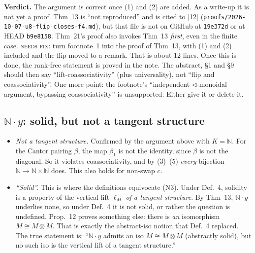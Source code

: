\documentclass[11pt]{article}
\newcommand{\tri}{\mathbin{\triangleleft}}
\newcommand{\N}{\mathbb{N}}
\newcommand{\iss}[1]{\textsc{#1}}
\begin{document}
\textbf{Verdict.} The argument is correct once (1) and (2) are added. As a write-up it is not yet a
proof. Thm~13 is ``not reproduced'' and is cited to [12] (\texttt{proofs/2026-10-07-u8-flip-closes-f4.md}),
but that file is not on GitHub at \texttt{19e372d} or at HEAD \texttt{b9e8158}. Thm~21's proof also
invokes Thm~13 \emph{first}, even in the finite case. \iss{needs fix}: turn footnote~1 into the proof
of Thm~13, with (1) and (2) included and the flip moved to a remark. That is about 12 lines. Once
this is done, the rank-free statement is proved in the note. The abstract, \S1 and \S9 should then
say ``lift-coassociativity'' (plus universality), not ``flip and coassociativity''. One more point:
the footnote's ``independent $\tri$-monoidal argument, bypassing coassociativity'' is unsupported.
Either give it or delete it.

\subsection{$\N\cdot y$: solid, but not a tangent structure}
\begin{itemize}[leftmargin=*]
\item \emph{Not a tangent structure.} Confirmed by the argument above with $K=\N$. For the Cantor
pairing $\beta$, the map $\beta_1$ is not the identity, since $\beta$ is not the diagonal. So it
violates coassociativity, and by (3)--(5) \emph{every} bijection $\N\to\N\times\N$ does. This also holds for
non-swap $c$.
\item \emph{``Solid''.} This is where the definitions equivocate (N3). Under Def.~4, solidity is a
property of the vertical lift $\ell_M$ \emph{of a tangent structure}. By Thm~13, $\N\cdot y$
underlies none, so under Def.~4 it is not solid, or rather the question is undefined. Prop.~12
proves something else: there is \emph{an} isomorphism $M\cong M\otimes M$. That is exactly the
abstract-iso notion that Def.~4 replaced. The true statement is: ``$\N\cdot y$ admits an iso
$M\cong M\otimes M$ (abstractly solid), but no such iso is the vertical lift of a tangent
structure.''
\end{itemize}
\end{document}
